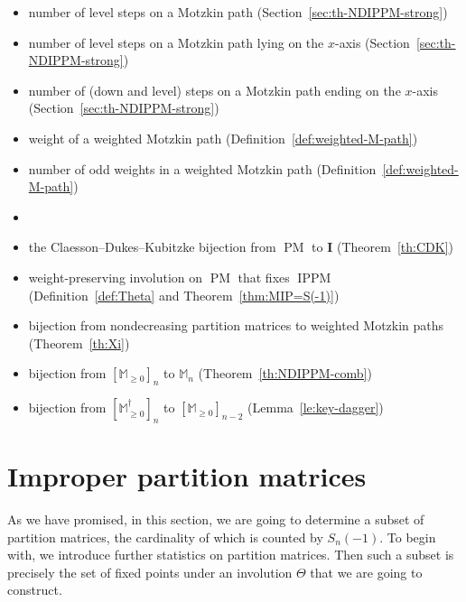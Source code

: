 \documentclass[12pt,reqno]{amsart}
\numberwithin{equation}{section}
\theoremstyle{theorem}
\theoremstyle{definition}
\theoremstyle{named}
\newcommand{\MatP}{\operatorname{PM}}
\newcommand{\bI}{\mathbf{I}}
\newcommand{\IPPM}{\operatorname{IPPM}}
\newcommand{\odd}{\operatorname{odd}}
\newcommand{\comp}{\operatorname{comp}}
\newcommand{\level}{\operatorname{level}}
\newcommand{\x}{\operatorname{x}}
\newcommand{\bbM}{\mathbb{M}}
\begin{document}
\begin{itemize}[
	itemindent=0pt, 
	leftmargin=2.75cm, 
	topsep=6pt, 
	itemsep=2pt,
	labelsep=0pt, 
	labelwidth=2.75cm,
	align=left
	]
	\item[$\level$] number of level steps on a Motzkin path (Section~\ref{sec:th-NDIPPM-strong})
	
	\item[$\level^{\x}$] number of level steps on a Motzkin path lying on the $x$-axis (Section~\ref{sec:th-NDIPPM-strong})
	
	\item[$\comp$] number of (down and level) steps on a Motzkin path ending on the $x$-axis (Section~\ref{sec:th-NDIPPM-strong})
	
	\item[$|\cdot|$] weight of a weighted Motzkin path (Definition~\ref{def:weighted-M-path})
	
	\item[$\odd$] number of odd weights in a weighted Motzkin path (Definition~\ref{def:weighted-M-path})
	
	\item[\textbf{\textsf{Mappings}}]
	
	\item[$\Pi$] the Claesson--Dukes--Kubitzke bijection from $\MatP$ to $\bI$ (Theorem~\ref{th:CDK})
	
	\item[$\Theta$] weight-preserving involution on $\MatP$ that fixes $\IPPM$ (Definition~\ref{def:Theta} and Theorem~\ref{thm:MIP=S(-1)})
	
	\item[$\Xi$] bijection from nondecreasing partition matrices to weighted Motzkin paths (Theorem~\ref{th:Xi})
	
	\item[$\Phi_n$] bijection from $[\bbM_{\ge 0}]_n$ to $\bbM_n$ (Theorem~\ref{th:NDIPPM-comb})
	
	\item[$\Omega_n$] bijection from $[\bbM_{\ge 0}^\dagger]_n$ to $[\bbM_{\ge 0}]_{n-2}$ (Lemma~\ref{le:key-dagger})
	
\end{itemize}


\section{Improper partition matrices}\label{sec:MIP}

As we have promised, in this section, we are going to determine a subset of partition matrices, the cardinality of which is counted by $S_n(-1)$. To begin with, we introduce further statistics on partition matrices. Then such a subset is precisely the set of fixed points under an involution $\Theta$ that we are going to construct.
\end{document}
